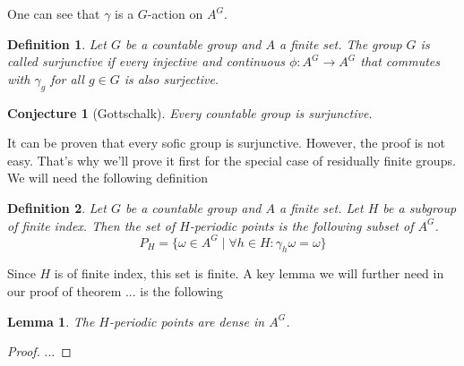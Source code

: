 \documentclass[a4paper]{report}
\newtheorem{definition}{Definition}
\newtheorem{lemma}{Lemma}
\newtheorem{conjecture}{Conjecture}
\begin{document}
    One can see that $\gamma$ is a $G$-action on $A^G$.
    \begin{definition}
        Let $G$ be a countable group and $A$ a finite set. The group $G$ is called surjunctive if every injective and continuous $\phi: A^{G}\to A^{G}$ that commutes with $\gamma_g$ for all $g \in G$ is also surjective.
    \end{definition}

    \begin{conjecture}[Gottschalk] \label{conj:gottschalk}
        Every countable group is surjunctive.
    \end{conjecture}

    It can be proven that every sofic group is surjunctive. However, the proof is not easy. That's why we'll prove it first for the special case of residually finite groups. We will need the following definition

    \begin{definition}
        Let $G$ be a countable group and $A$ a finite set. Let $H$ be a subgroup of finite index. Then the set of $H$-periodic points is the following subset of $A^G$.
        \[
        P_H = \{ \omega \in A^G  \mid \forall h \in H: \gamma_h\omega = \omega\}
        \]
    \end{definition}

    Since $H$ is of finite index, this set is finite. %
    A key lemma we will further need in our proof of theorem ... is the following

    \begin{lemma} \label{lem:h-periodic_points}
    The $H$-periodic points are dense in $A^G$.
    \end{lemma}
    \begin{proof}
    ...
    \end{proof}
\end{document}
